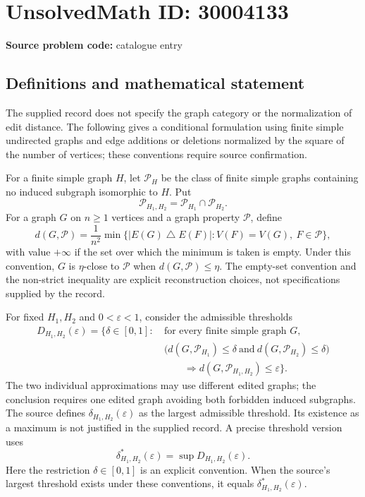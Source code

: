 \documentclass[11pt]{article}
\begin{document}
\section*{UnsolvedMath ID: 30004133}
\textbf{Source problem code:} catalogue entry
\subsection{Definitions and mathematical statement}
The supplied record does not specify the graph category or the normalization of edit distance. The following gives a conditional formulation using finite simple undirected graphs and edge additions or deletions normalized by the square of the number of vertices; these conventions require source confirmation.

For a finite simple graph \(H\), let \(\mathcal P_H\) be the class of finite simple graphs containing no induced subgraph isomorphic to \(H\). Put
\[
\mathcal P_{H_1,H_2}=\mathcal P_{H_1}\cap\mathcal P_{H_2}.
\]
For a graph \(G\) on \(n\geq 1\) vertices and a graph property \(\mathcal P\), define
\[
d(G,\mathcal P)=\frac{1}{n^2}\min\bigl\{|E(G)\mathbin{\triangle}E(F)|:V(F)=V(G),\ F\in\mathcal P\bigr\},
\]
with value \(+\infty\) if the set over which the minimum is taken is empty. Under this convention, \(G\) is \(\eta\)-close to \(\mathcal P\) when \(d(G,\mathcal P)\leq\eta\). The empty-set convention and the non-strict inequality are explicit reconstruction choices, not specifications supplied by the record.

For fixed \(H_1,H_2\) and \(0<\varepsilon<1\), consider the admissible thresholds
\[
\begin{split}
D_{H_1,H_2}(\varepsilon)=\bigl\{\delta\in[0,1]:\ &\text{for every finite simple graph }G,\\
&\bigl(d(G,\mathcal P_{H_1})\leq\delta\ \text{and}\ d(G,\mathcal P_{H_2})\leq\delta\bigr)\\
&\qquad\Longrightarrow d(G,\mathcal P_{H_1,H_2})\leq\varepsilon\bigr\}.
\end{split}
\]
The two individual approximations may use different edited graphs; the conclusion requires one edited graph avoiding both forbidden induced subgraphs. The source defines \(\delta_{H_1,H_2}(\varepsilon)\) as the largest admissible threshold. Its existence as a maximum is not justified in the supplied record. A precise threshold version uses
\[
\delta^*_{H_1,H_2}(\varepsilon)=\sup D_{H_1,H_2}(\varepsilon).
\]
Here the restriction \(\delta\in[0,1]\) is an explicit convention. When the source's largest threshold exists under these conventions, it equals \(\delta^*_{H_1,H_2}(\varepsilon)\).
\end{document}
